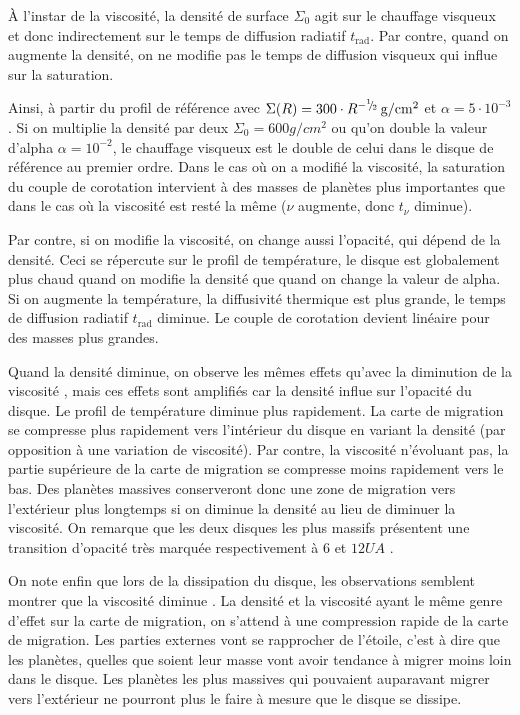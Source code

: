 À l'instar de la viscosité, la densité de surface $\Sigma_0$ agit sur le chauffage visqueux et donc indirectement sur le temps de diffusion radiatif $t_\text{rad}$. Par contre, quand on augmente la densité, on ne modifie pas le temps de diffusion visqueux qui influe sur la saturation. 

Ainsi, à partir du profil de référence avec $\Sigma(R) = 300 \cdot
R^{-{{}^{1\!\!}/ _{\!2}}}\mathrm{\thinspace g/cm^2}$ et $\alpha=5\cdot 10^{-3}$. Si on multiplie la densité par deux $\Sigma_0=600\unit{g/cm^2}$ ou qu'on double la valeur d'alpha $\alpha=10^{-2}$, le chauffage visqueux est le double de celui dans le disque de référence au premier ordre. Dans le cas où on a modifié la viscosité, la saturation du couple de corotation intervient à des masses de planètes plus importantes que dans le cas où la viscosité est resté la même ($\nu$ augmente, donc $t_\nu$ diminue).  

Par contre, si on modifie la viscosité, on change aussi l'opacité, qui dépend de la densité. Ceci se répercute sur le profil de température, le disque est globalement plus chaud quand on modifie la densité que quand on change la valeur de alpha. Si on augmente la température, la diffusivité thermique est plus grande, le temps de diffusion radiatif $t_\text{rad}$ diminue. Le couple de corotation devient linéaire pour des masses plus grandes. 

Quand la densité diminue, on observe les mêmes effets qu'avec la diminution de la viscosité , mais ces effets sont amplifiés car la densité influe sur l'opacité du disque. Le profil de température diminue plus rapidement. La carte de migration se compresse plus rapidement vers l'intérieur du disque en variant la densité (par opposition à une variation de viscosité). Par contre, la viscosité n'évoluant pas, la partie supérieure de la carte de migration se compresse moins rapidement vers le bas. Des planètes massives conserveront donc une zone de migration vers l'extérieur plus longtemps si on diminue la densité au lieu de diminuer la viscosité. On remarque que les deux disques les plus massifs présentent une transition d'opacité très marquée respectivement à $6$  et $12\unit{UA}$ . 

\bigskip

On note enfin que lors de la dissipation du disque, les observations semblent montrer que la viscosité diminue \citep[fig. 16]{guilloteau2011dual}. La densité et la viscosité ayant le même genre d'effet sur la carte de migration, on s'attend à une compression rapide de la carte de migration. Les parties externes vont se rapprocher de l'étoile, c'est à dire que les planètes, quelles que soient leur masse vont avoir tendance à migrer moins loin dans le disque. Les planètes les plus massives qui pouvaient auparavant migrer vers l'extérieur ne pourront plus le faire à mesure que le disque se dissipe. 

